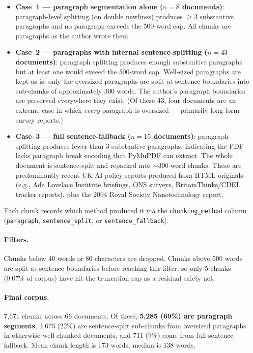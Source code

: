 \documentclass[11pt, a4paper]{article}
\begin{document}
\begin{itemize}
\item \textbf{Case~1 --- paragraph segmentation alone ($n=8$ documents)}:
      paragraph-level splitting (on double newlines) produces $\geq 3$
      substantive paragraphs and no paragraph exceeds the 500-word cap.
      All chunks are paragraphs as the author wrote them.
\item \textbf{Case~2 --- paragraphs with internal sentence-splitting
      ($n=43$ documents)}: paragraph splitting produces enough
      substantive paragraphs but at least one would exceed the 500-word
      cap.  Well-sized paragraphs are kept as-is; only the oversized
      paragraphs are split at sentence boundaries into sub-chunks of
      approximately 300 words.  The author's paragraph boundaries are
      preserved everywhere they exist.  (Of these 43, four documents are
      an extreme case in which \emph{every} paragraph is oversized ---
      primarily long-form survey reports.)
\item \textbf{Case~3 --- full sentence-fallback ($n=15$ documents)}:
      paragraph splitting produces fewer than 3 substantive paragraphs,
      indicating the PDF lacks paragraph break encoding that PyMuPDF can
      extract.  The whole document is sentence-split and repacked into
      $\sim$300-word chunks.  These are predominantly recent UK AI policy
      reports produced from HTML originals (e.g., Ada Lovelace Institute
      briefings, ONS surveys, BritainThinks/CDEI tracker reports), plus
      the 2004 Royal Society Nanotechnology report.
\end{itemize}

Each chunk records which method produced it via the
\texttt{chunking\_method} column (\texttt{paragraph},
\texttt{sentence\_split}, or \texttt{sentence\_fallback}).

\paragraph{Filters.}  Chunks below 40 words or 80 characters are
dropped.  Chunks above 500 words are split at sentence boundaries before
reaching this filter, so only 5 chunks (0.07\% of corpus) have hit the
truncation cap as a residual safety net.

\paragraph{Final corpus.}  7,671 chunks across 66 documents.  Of these,
\textbf{5,285 (69\%) are paragraph segments}, 1,675 (22\%) are
sentence-split sub-chunks from oversized paragraphs in otherwise
well-chunked documents, and 711 (9\%) come from full sentence-fallback.
Mean chunk length is 173 words; median is 138 words.
\end{document}

